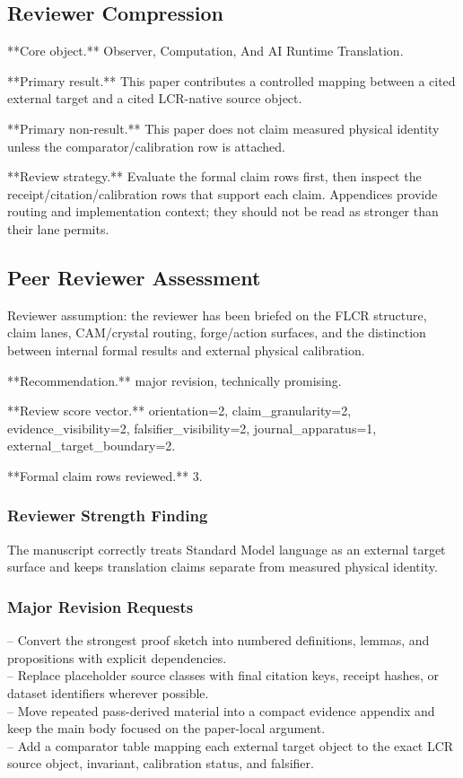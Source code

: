 \documentclass[11pt]{article}
\begin{document}
\subsection*{Reviewer Compression}

**Core object.** Observer, Computation, And AI Runtime Translation.

**Primary result.** This paper contributes a controlled mapping between a cited external target and a cited LCR-native source object.

**Primary non-result.** This paper does not claim measured physical identity unless the comparator/calibration row is attached.

**Review strategy.** Evaluate the formal claim rows first, then inspect the receipt/citation/calibration rows that support each claim. Appendices provide routing and implementation context; they should not be read as stronger than their lane permits.

\subsection*{Peer Reviewer Assessment}

Reviewer assumption: the reviewer has been briefed on the FLCR structure, claim lanes, CAM/crystal routing, forge/action surfaces, and the distinction between internal formal results and external physical calibration.

**Recommendation.** major revision, technically promising.

**Review score vector.** orientation=2, claim\_granularity=2, evidence\_visibility=2, falsifier\_visibility=2, journal\_apparatus=1, external\_target\_boundary=2.

**Formal claim rows reviewed.** 3.

\subsubsection*{Reviewer Strength Finding}

The manuscript correctly treats Standard Model language as an external target surface and keeps translation claims separate from measured physical identity.

\subsubsection*{Major Revision Requests}

\noindent{}-- Convert the strongest proof sketch into numbered definitions, lemmas, and propositions with explicit dependencies.\\
\noindent{}-- Replace placeholder source classes with final citation keys, receipt hashes, or dataset identifiers wherever possible.\\
\noindent{}-- Move repeated pass-derived material into a compact evidence appendix and keep the main body focused on the paper-local argument.\\
\noindent{}-- Add a comparator table mapping each external target object to the exact LCR source object, invariant, calibration status, and falsifier.\\
\end{document}
